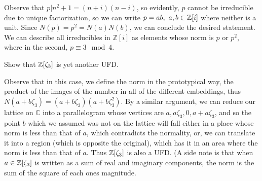 Observe that \(p|n^2+1=(n+i)(n-i)\), so evidently, \(p\) cannot be irreducible due to unique factorization, so we can write \(p=ab, \ a,b \in \mathbb Z[i] \) where neither is a unit. Since \(N(p)=p^2=N(a)N(b)\), we can conclude the desired statement.
We can describe all irreducibles in \(\mathbb{Z}[i]\) as elements whose norm is \(p\) or \(p^2\), where in the second, \( p \equiv 3 \mod 4\).

\begin{problem}
Show that \(\mathbb Z[\zeta_3]\) is yet another UFD.
\end{problem}

Observe that in this case, we define the norm in the prototypical way, the product of the images of the number in all of the different embeddings, thus \(N(a+b\zeta_3)=(a+b\zeta_3)(a+b\zeta_3^2)\). By a similar argument, we can reduce our lattice on \(\mathbb{C}\) into a parallelogram whose vertices are \(a, a\zeta_3, 0, a+a\zeta_3\), and so the point \(b\) which we assumed was not on the lattice will fall either in a place whose norm is less than that of \(a\), which contradicts the normality, or, we can translate it into a region (which is opposite the original), which has it in an area where the norm is less than that of \(a\). Thus \(\mathbb Z[\zeta_3]\) is also a UFD. (A side note is that when \(a \in \mathbb Z[\zeta_3]\) is written as a sum of real and imaginary components, the norm is the sum of the square of each ones magnitude.

